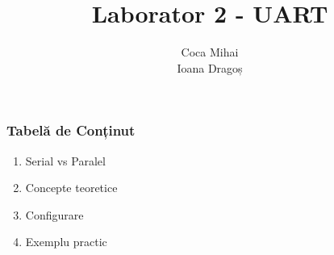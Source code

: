 \documentclass[xcolor={table}]{beamer}
\title{Laborator 2 - UART}
\subtitle{}
\author{Coca Mihai \\
        Ioana Dragoș}
\begin{document}
	\setcounter{showProgressBar}{0}
	\setcounter{showSlideNumbers}{0}

	\frame{\titlepage}

	\begin{frame}
		\frametitle{Tabelă de Conținut}
		\begin{enumerate}
			\item Serial vs Paralel
            \item Concepte teoretice
			\item Configurare
			\item Exemplu practic
		\end{enumerate}
	\end{frame}

	\setcounter{framenumber}{0}
	\setcounter{showProgressBar}{1}
	\setcounter{showSlideNumbers}{1}
	
\end{document}
